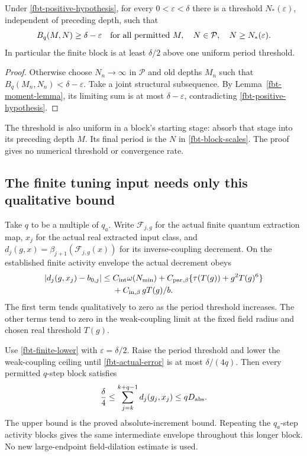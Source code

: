 \begin{proposition}
\label{fbt-transfer-proposition}
Under \eqref{fbt-positive-hypothesis}, for every
\(0<\varepsilon<\delta\) there is a threshold
\(N_*(\varepsilon)\), independent of preceding depth,
such that
\begin{equation}
 B_q(M,N)\ge\delta-\varepsilon
 \quad\hbox{for all permitted }M,\quad
 N\in\mathcal P,\quad N\ge N_*(\varepsilon).
 \label{fbt-finite-lower}
\end{equation}
In particular the finite block is at least \(\delta/2\)
above one uniform period threshold.
\end{proposition}
\begin{proof}
Otherwise choose \(N_n\to\infty\) in \(\mathcal P\)
and old depths \(M_n\) such that
\(B_q(M_n,N_n)<\delta-\varepsilon\).
Take a joint structural subsequence. By
Lemma~\ref{fbt-moment-lemma}, its limiting sum is at most
\(\delta-\varepsilon\), contradicting
\eqref{fbt-positive-hypothesis}.
\end{proof}

The threshold is also uniform in a block's starting
stage: absorb that stage into its preceding depth \(M\).
Its final period is the \(N\) in
\eqref{fbt-block-scales}. The proof gives no numerical
threshold or convergence rate.

\subsection{The finite tuning input needs only this qualitative bound}
\label{fbt-tuning-section}

Take \(q\) to be a multiple of \(q_a\). Write
\(\mathcal F_{j,g}\) for the actual finite quantum extraction map,
\(x_j\) for the actual real extracted input class, and
\(d_j(g,x)=\beta_{j+1}(\mathcal F_{j,g}(x))\) for its
inverse-coupling decrement. On the established
finite activity envelope the actual decrement obeys
\begin{align}
 |d_j(g,x_j)-b_{0,j}|
 \le{}&C_{\rm int}\omega(N_{\min})
       +C_{{\rm par},\beta}
                    \{\tau(T(g))+g^2T(g)^6\}\notag\\
 &+C_{{\rm in},\beta}\,gT(g)/b.
 \label{fbt-actual-error}
\end{align}
The first term tends qualitatively to zero as the
period threshold increases. The other terms tend to
zero in the weak-coupling limit at the fixed field
radius and chosen real threshold \(T(g)\).

Use \eqref{fbt-finite-lower} with
\(\varepsilon=\delta/2\). Raise the period threshold
and lower the weak-coupling ceiling until
\eqref{fbt-actual-error} is at most \(\delta/(4q)\).
Then every permitted \(q\)-step block satisfies
\begin{equation}
 \frac{\delta}{4}\le
       \sum_{j=k}^{k+q-1}d_j(g_j,x_j)
       \le qD_{\rm abs}.
 \label{fbt-actual-block}
\end{equation}
The upper bound is the proved absolute-increment bound.
Repeating the \(q_a\)-step activity blocks gives the same
intermediate envelope throughout this longer block.
No new large-endpoint field-dilation estimate is used.

